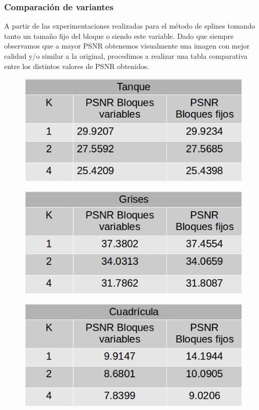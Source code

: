 \documentclass[a4paper]{article}
\begin{document}
\subsubsection{Comparación de variantes}
A partir de las experimentaciones realizadas para el método de splines tomando tanto un tamaño fijo del bloque o siendo este variable. Dado que siempre observamos que a mayor PSNR obtenemos visualmente una imagen con mejor calidad y/o similar a la original, procedimos a realizar una tabla comparativa entre los distintos valores de PSNR obtenidos.  

 \begin{figure}[H]
    \centering
    \includegraphics[scale=0.4]{imagenes/tanqueMetodosDif.jpg}
	\label{autoe}
    \end{figure}

 \begin{figure}[H]
    \centering
    \includegraphics[scale=0.4]{imagenes/grisesMetodosDif.jpg}
	\label{autoe}
    \end{figure}
    
    
     \begin{figure}[H]
    \centering
    \includegraphics[scale=0.4]{imagenes/cuadriculaMetodosDif.jpg}
	\label{autoe}
    \end{figure}
    
\end{document}
